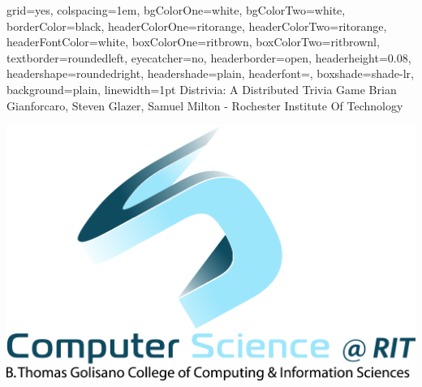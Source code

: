 \documentclass[landscape,a0paper,final,showframe]{baposter}
\begin{document}
\begin{poster}{
  grid=yes,
  colspacing=1em,
  bgColorOne=white,
  bgColorTwo=white,
  borderColor=black,
  headerColorOne=ritorange,
  headerColorTwo=ritorange,
  headerFontColor=white,
  boxColorOne=ritbrown,
  boxColorTwo=ritbrownl,
  textborder=roundedleft,
  eyecatcher=no,
  headerborder=open,
  headerheight=0.08\textheight,
  headershape=roundedright,
  headershade=plain,
  headerfont=\Large\textsf, %
  boxshade=shade-lr,
  background=plain,
  linewidth=1pt
  }
  {} %
  {\sf %
  Distrivia: A Distributed Trivia Game}
  {\sf %
  \newline
  Brian Gianforcaro, Steven Glazer, Samuel Milton
  - Rochester Institute Of Technology
  }
  {{\begin{minipage}{18em}
    \hfill
    \includegraphics[scale=0.05]{logo}
  \end{minipage}}
  }


     \newlength{\leftimgwidth}
     \setlength{\leftimgwidth}{0.78em+8.0em}


\end{poster}
\end{document}
